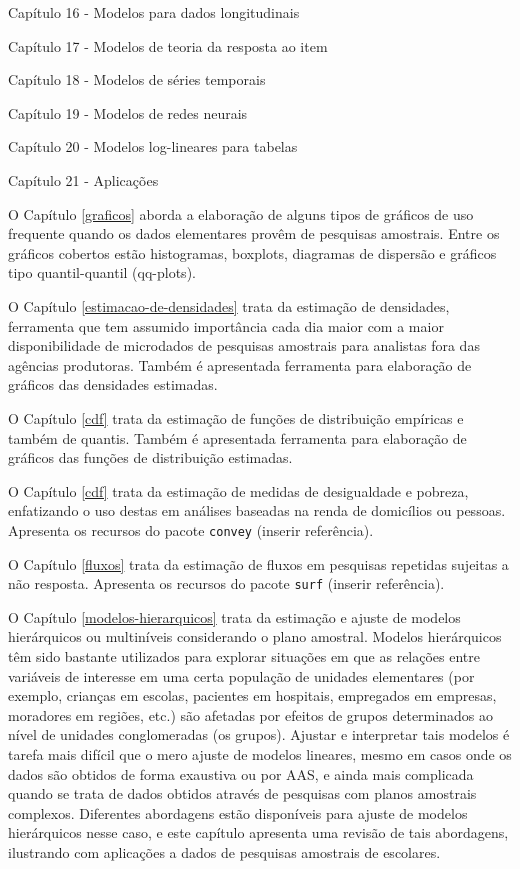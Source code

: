 \documentclass[
  12pt,
  brazilian,
]{book}
\theoremstyle{definition}
\theoremstyle{definition}
\theoremstyle{definition}
\theoremstyle{definition}
\theoremstyle{remark}
\begin{document}
Capítulo 16 - Modelos para dados longitudinais

Capítulo 17 - Modelos de teoria da resposta ao item

Capítulo 18 - Modelos de séries temporais

Capítulo 19 - Modelos de redes neurais

Capítulo 20 - Modelos log-lineares para tabelas

Capítulo 21 - Aplicações

O Capítulo \ref{graficos} aborda a elaboração de alguns tipos de gráficos de uso frequente quando os dados elementares provêm de pesquisas amostrais. Entre os gráficos cobertos estão histogramas, boxplots, diagramas de dispersão e gráficos tipo quantil-quantil (qq-plots).

O Capítulo \ref{estimacao-de-densidades} trata da estimação de densidades, ferramenta que tem assumido importância cada dia maior com a maior disponibilidade de microdados de pesquisas amostrais para analistas fora das agências produtoras. Também é apresentada ferramenta para elaboração de gráficos das densidades estimadas.

O Capítulo \ref{cdf} trata da estimação de funções de distribuição empíricas e também de quantis. Também é apresentada ferramenta para elaboração de gráficos das funções de distribuição estimadas.

O Capítulo \ref{cdf} trata da estimação de medidas de desigualdade e pobreza, enfatizando o uso destas em análises baseadas na renda de domicílios ou pessoas. Apresenta os recursos do pacote \texttt{convey} (inserir referência).

O Capítulo \ref{fluxos} trata da estimação de fluxos em pesquisas repetidas sujeitas a não resposta. Apresenta os recursos do pacote \texttt{surf} (inserir referência).

O Capítulo \ref{modelos-hierarquicos} trata da estimação e ajuste de modelos hierárquicos ou multiníveis considerando o plano amostral. Modelos hierárquicos têm sido bastante utilizados para explorar situações em que as relações entre variáveis de interesse em uma certa população de unidades elementares (por exemplo, crianças em escolas, pacientes em hospitais, empregados em empresas, moradores em regiões, etc.) são afetadas por efeitos de grupos determinados ao nível de unidades conglomeradas (os grupos). Ajustar e interpretar tais modelos é tarefa mais difícil que o mero ajuste de modelos lineares, mesmo em casos onde os dados são obtidos de forma exaustiva ou por AAS, e ainda mais complicada quando se trata de dados obtidos através de pesquisas com planos amostrais complexos. Diferentes abordagens estão disponíveis para ajuste de modelos hierárquicos nesse caso, e este capítulo apresenta uma revisão de tais abordagens, ilustrando com aplicações a dados de pesquisas amostrais de escolares.
\end{document}
